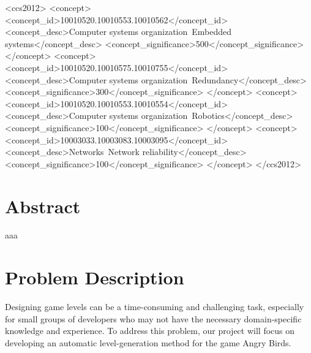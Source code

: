 \documentclass[manuscript,screen,review]{acmart}
\begin{document}
\begin{CCSXML}
<ccs2012>
 <concept>
  <concept_id>10010520.10010553.10010562</concept_id>
  <concept_desc>Computer systems organization~Embedded systems</concept_desc>
  <concept_significance>500</concept_significance>
 </concept>
 <concept>
  <concept_id>10010520.10010575.10010755</concept_id>
  <concept_desc>Computer systems organization~Redundancy</concept_desc>
  <concept_significance>300</concept_significance>
 </concept>
 <concept>
  <concept_id>10010520.10010553.10010554</concept_id>
  <concept_desc>Computer systems organization~Robotics</concept_desc>
  <concept_significance>100</concept_significance>
 </concept>
 <concept>
  <concept_id>10003033.10003083.10003095</concept_id>
  <concept_desc>Networks~Network reliability</concept_desc>
  <concept_significance>100</concept_significance>
 </concept>
</ccs2012>
\end{CCSXML}




\maketitle

\section{Abstract}
aaa

\section{Problem Description}
Designing game levels can be a time-consuming and challenging task, especially for small groups of developers who may not have the necessary domain-specific knowledge and experience. To address this problem, our project will focus on developing an automatic level-generation method for the game Angry Birds.
\end{document}
